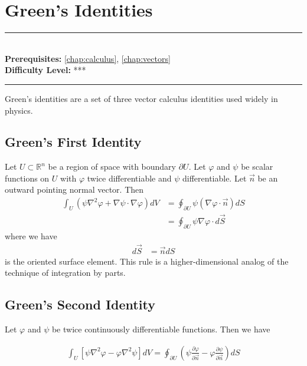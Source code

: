 \documentclass[book.tex]{subfiles}
\begin{document}
\chapter{Green's Identities}

\label{chap:greens_identities}
\noindent\rule{11cm}{0.4pt} \\
\textbf{Prerequisites:}  \autoref{chap:calculus}, \autoref{chap:vectors} \\
\textbf{Difficulty Level:} *** \\
\noindent\rule{11cm}{0.4pt}
\vspace{5mm}



Green's identities are a set of three vector calculus identities used widely in physics.

\section{Green's First Identity}
Let $U \subset \mathbb{R}^n$ be a region of space with boundary $\partial U$. Let $\varphi$ and $\psi$ be scalar functions on $U$ with $\varphi$ twice differentiable and $\psi$ differentiable. Let $\vec{n}$ be an outward pointing normal vector. Then
\begin{align}
\int_U (\psi \nabla^2 \varphi + \nabla \psi \cdot \nabla \varphi) dV &= \oint_{\partial U} \psi (\nabla \varphi \cdot \vec{n}) dS \\
&= \oint_{\partial U} \psi \nabla \varphi \cdot d\vec{S}
\end{align}
where we have
\begin{align}
d\vec{S} &= \vec{n} dS
\end{align}
is the oriented surface element. This rule is a higher-dimensional analog of the technique of integration by parts.

\section{Green's Second Identity}

Let $\varphi$ and $\psi$ be twice continuously differentiable functions. Then we have 

\begin{align}
\int_U \left [ \psi \nabla^2  \varphi - \varphi \nabla^2  \psi   \right] dV = \oint_{\partial U} \left ( \psi \frac{\partial \varphi}{\partial \vec{n}} - \varphi \frac{\partial \psi}{\partial \vec{n}} \right ) dS
\end{align}
\end{document}
